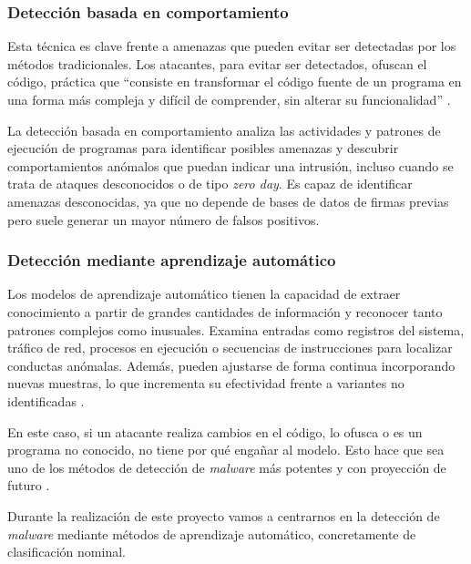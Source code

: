 \subsubsection{Detección basada en comportamiento}
\label{subsubsec:comportamiento}

Esta técnica es clave frente a amenazas que pueden evitar ser detectadas por los métodos tradicionales. Los atacantes, para evitar ser detectados, ofuscan el código, práctica que ``consiste en transformar el código fuente de un programa en una forma más compleja y difícil de comprender, sin alterar su funcionalidad'' \cite{ofuscacion}.

\vspace{1em}

La detección basada en comportamiento analiza las actividades y patrones de ejecución de programas para identificar posibles amenazas y descubrir comportamientos anómalos que puedan indicar una intrusión, incluso cuando se trata de ataques desconocidos o de tipo \textit{zero day}. Es capaz de identificar amenazas desconocidas, ya que no depende de bases de datos de firmas previas pero suele generar un mayor número de falsos positivos.

\subsubsection{Detección mediante aprendizaje automático}
\label{subsubsec:ml}

Los modelos de aprendizaje automático tienen la capacidad de extraer conocimiento a partir de grandes cantidades de información y reconocer tanto patrones complejos como inusuales. Examina entradas como registros del sistema, tráfico de red, procesos en ejecución o secuencias de instrucciones para localizar conductas anómalas. Además, pueden ajustarse de forma continua incorporando nuevas muestras, lo que incrementa su efectividad frente a variantes no identificadas \cite{s2grupo}.

\vspace{1em}

En este caso, si un atacante realiza cambios en el código, lo ofusca o es un programa no conocido, no tiene por qué engañar al modelo. Esto hace que sea uno de los métodos de detección de \textit{malware} más potentes y con proyección de futuro \cite{ml_mw}.

Durante la realización de este proyecto vamos a centrarnos en la detección de \textit{malware} mediante métodos de aprendizaje automático, concretamente de clasificación nominal.
